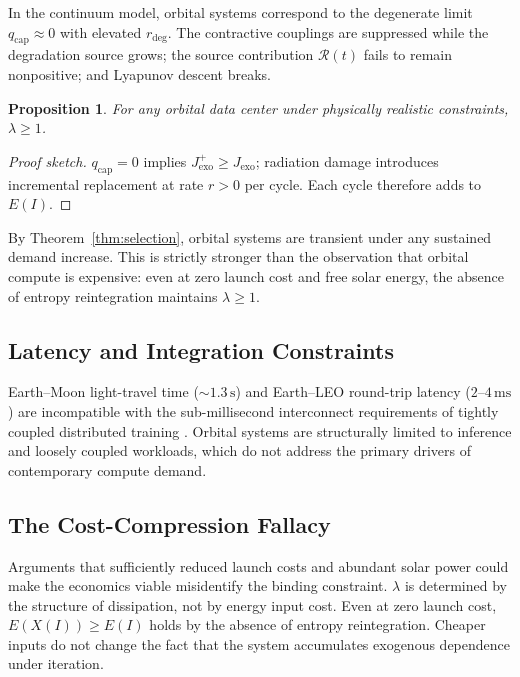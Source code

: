 \documentclass[10pt,twocolumn]{article}
\theoremstyle{plain}
\newtheorem{proposition}[theorem]{Proposition}
\theoremstyle{definition}
\theoremstyle{remark}
\begin{document}
In the continuum model, orbital systems correspond to the degenerate
limit $q_{\mathrm{cap}} \approx 0$ with elevated $r_{\mathrm{deg}}$.
The contractive couplings are suppressed while the degradation source
grows; the source contribution $\mathcal{R}(t)$ fails to remain
nonpositive; and Lyapunov descent breaks.

\begin{proposition}
For any orbital data center under physically realistic constraints,
$\lambda \geq 1$.
\end{proposition}

\begin{proof}[Proof sketch]
$q_{\mathrm{cap}} = 0$ implies $J_{\mathrm{exo}}^+ \geq J_{\mathrm{exo}}$;
radiation damage introduces incremental replacement at rate $r > 0$ per
cycle. Each cycle therefore adds to $E(I)$.
\end{proof}

By Theorem~\ref{thm:selection}, orbital systems are transient under any
sustained demand increase. This is strictly stronger than the observation
that orbital compute is expensive: even at zero launch cost and free
solar energy, the absence of entropy reintegration maintains $\lambda \geq 1$.

\subsection{Latency and Integration Constraints}

Earth--Moon light-travel time ($\sim 1.3\,\text{s}$) and Earth--LEO
round-trip latency ($2$--$4\,\text{ms}$) are incompatible with the
sub-millisecond interconnect requirements of tightly coupled distributed
training \citep{wertz2011}. Orbital systems are structurally limited to
inference and loosely coupled workloads, which do not address the
primary drivers of contemporary compute demand.

\subsection{The Cost-Compression Fallacy}

Arguments that sufficiently reduced launch costs and abundant solar
power could make the economics viable misidentify the binding constraint.
$\lambda$ is determined by the structure of dissipation, not by energy
input cost. Even at zero launch cost, $E(X(I)) \geq E(I)$ holds by the
absence of entropy reintegration. Cheaper inputs do not change the fact
that the system accumulates exogenous dependence under iteration.
\end{document}
